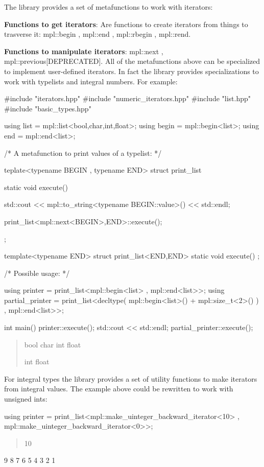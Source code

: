 The library provides a set of metafunctions to work with iterators\+:
\begin{DoxyItemize}
\item {\bfseries Functions to get iterators}\+: Are functions to create iterators from things to trasverse it\+: {\ttfamily mpl\+::begin} , {\ttfamily mpl\+::end} , {\ttfamily mpl\+::rbegin} , {\ttfamily mpl\+::rend}.
\item {\bfseries Functions to manipulate iterators}\+: {\ttfamily mpl\+::next} , {\ttfamily mpl\+::previous}\mbox{[}D\+E\+P\+R\+E\+C\+A\+T\+E\+D\mbox{]}. All of the metafunctions above can be specialized to implement user-\/defined iterators. In fact the library provides specializations to work with typelists and integral numbers. For example\+: \begin{DoxyVerb}  #include "iterators.hpp"
  #include "numeric_iterators.hpp"
  #include "list.hpp"
  #include "basic_types.hpp"

  using list  = mpl::list<bool,char,int,float>;
  using begin = mpl::begin<list>;
  using end   = mpl::end<list>;

  /* A metafunction to print values of a typelist: */

  teplate<typename BEGIN , typename END>
  struct print_list
  {
    static void execute()
    {
        std::cout << mpl::to_string<typename BEGIN::value>() << std::endl;

        print_list<mpl::next<BEGIN>,END>::execute();
    }
  };

  template<typename END>
  struct print_list<END,END>
  {
    static void execute() {}
  };

  /* Possible usage: */

  using printer = print_list<mpl::begin<list> , mpl::end<list>>;
  using partial_printer = print_list<decltype( mpl::begin<list>() + mpl::size_t<2>() )  , mpl::end<list>>;


  int main()
  {
    printer::execute();
    std::cout << std::endl;
    partial_printer::execute();
  }
\end{DoxyVerb}
 \begin{quote}
bool char int float

int float \end{quote}

\end{DoxyItemize}

For integral types the library provides a set of utility functions to make iterators from integral values. The example above could be rewritten to work with unsigned ints\+: \begin{DoxyVerb}using printer = print_list<mpl::make_uinteger_backward_iterator<10> , mpl::make_uinteger_backward_iterator<0>>;
\end{DoxyVerb}
 \begin{quote}
10 \end{quote}
9 8 7 6 5 4 3 2 1

